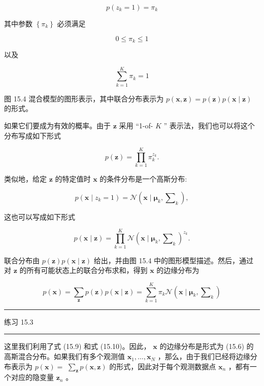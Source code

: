 \documentclass[10pt]{report}
\newcommand{\HRule}{\begin{center}\rule{0.9\linewidth}{0.2mm}\end{center}}
\begin{document}
\[
p\left( {{z}_{k} = 1}\right)  = {\pi }_{k}
\]

其中参数 \(\left\{  {\pi }_{k}\right\}\) 必须满足

\[
0 \leq  {\pi }_{k} \leq  1 \tag{15.7}
\]

以及

\[
\mathop{\sum }\limits_{{k = 1}}^{K}{\pi }_{k} = 1 \tag{15.8}
\]

图 15.4 混合模型的图形表示，其中联合分布表示为 \(p\left( {\mathbf{x},\mathbf{z}}\right)  = p\left( \mathbf{z}\right) p\left( {\mathbf{x} \mid  \mathbf{z}}\right)\) 的形式。

如果它们要成为有效的概率。由于 \(\mathbf{z}\) 采用 “1-of- \(K\) ” 表示法，我们也可以将这个分布写成如下形式

\[
p\left( \mathbf{z}\right)  = \mathop{\prod }\limits_{{k = 1}}^{K}{\pi }_{k}^{{z}_{k}}. \tag{15.9}
\]

类似地，给定 \(\mathbf{z}\) 的特定值时 \(\mathbf{x}\) 的条件分布是一个高斯分布:

\[
p\left( {\mathbf{x} \mid  {z}_{k} = 1}\right)  = \mathcal{N}\left( {\mathbf{x} \mid  {\mathbf{\mu }}_{k},{\mathbf{\sum }}_{k}}\right) ,
\]

这也可以写成如下形式

\[
p\left( {\mathbf{x} \mid  \mathbf{z}}\right)  = \mathop{\prod }\limits_{{k = 1}}^{K}\mathcal{N}{\left( \mathbf{x} \mid  {\mathbf{\mu }}_{k},{\mathbf{\sum }}_{k}\right) }^{{z}_{k}}. \tag{15.10}
\]

联合分布由 \(p\left( \mathbf{z}\right) p\left( {\mathbf{x} \mid  \mathbf{z}}\right)\) 给出，并由图 15.4 中的图形模型描述。然后，通过对 \(\mathbf{z}\) 的所有可能状态上的联合分布求和，得到 \(\mathbf{x}\) 的边缘分布为

\[
p\left( \mathbf{x}\right)  = \mathop{\sum }\limits_{\mathbf{z}}p\left( \mathbf{z}\right) p\left( {\mathbf{x} \mid  \mathbf{z}}\right)  = \mathop{\sum }\limits_{{k = 1}}^{K}{\pi }_{k}\mathcal{N}\left( {\mathbf{x} \mid  {\mathbf{\mu }}_{k},{\mathbf{\sum }}_{k}}\right)  \tag{15.11}
\]

\HRule

练习 15.3

\HRule

这里我们利用了式 (15.9) 和式 (15.10)。因此， \(\mathbf{x}\) 的边缘分布是形式为 (15.6) 的高斯混合分布。如果我们有多个观测值 \({\mathbf{x}}_{1},\ldots ,{\mathbf{x}}_{N}\) ，那么，由于我们已经将边缘分布表示为 \(p\left( \mathbf{x}\right)  =\)  \(\mathop{\sum }\limits_{\mathbf{z}}p\left( {\mathbf{x},\mathbf{z}}\right)\) 的形式，因此对于每个观测数据点 \({\mathbf{x}}_{n}\) ，都有一个对应的隐变量 \({\mathbf{z}}_{n}\) 。
\end{document}
